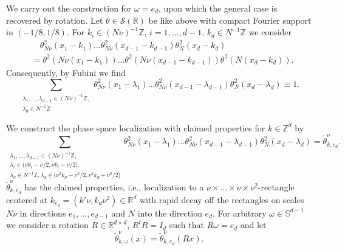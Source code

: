 \documentclass{amsart}
\numberwithin{equation}{section}
\theoremstyle{definition}
\newcommand{\R}{\mathbb{R}}
\newcommand{\Z}{\mathbb{Z}}
\begin{document}
We carry out the construction for $\omega = e_d$, upon which the general case is recovered by rotation. Let $\theta \in \mathcal{S}(\R)$ be like above with compact Fourier support in $(-1/8,1/8)$. For $k_i \in (N \nu)^{-1} \Z$, $i=1,\ldots,d-1$, $k_d \in N^{-1} \Z$ we consider
\begin{equation*}
\begin{split}
&\quad \theta^2_{N \nu}(x_1-k_1) \ldots \theta^2_{N \nu}(x_{d-1} - k_{d-1}) \theta^2_N(x_d-k_d) \\
&= \theta^2(N \nu(x_1-k_1)) \ldots \theta^2(N \nu(x_{d-1} - k_{d-1})) \theta^2(N(x_d - k_d)).
\end{split}
\end{equation*}
Consequently, by Fubini we find
\begin{equation*}
\sum_{\substack{ \lambda_1,\ldots, \lambda_{d-1} \in (N \nu)^{-1} \Z, \\ \lambda_d \in N^{-1} \Z}} \theta^2_{N \nu}(x_1-\lambda_1) \ldots \theta^2_{N \nu}(x_{d-1} - \lambda_{d-1}) \theta^2_N(x_d - \lambda_d) \equiv 1.
\end{equation*}

We construct the phase space localization with claimed properties for $k \in \Z^d$ by
\begin{equation*}
\sum_{\substack{ \lambda_1,\ldots,\lambda_{d-1} \in (N \nu)^{-1} \Z, \\ \lambda_i \in (\nu k_i - \nu/2, \nu k_i + \nu/2], \\ \lambda_d \in N^{-1} \Z, \lambda_d \in (\nu^2 k_d - \nu^2/2,\nu^2 k_d + \nu^2/2]}} \theta^2_{N \nu}(x_1 - \lambda_1) \ldots \theta^2_{N \nu}(x_{d-1} - \lambda_{d-1}) \theta_N^2(x_d- \lambda_d) = \tilde{\theta}_{k,e_d}^{\nu}.
\end{equation*}
$\tilde{\theta}_{k,e_d}^{\nu}$ has the claimed properties, i.e., localization to a $\nu \times \ldots \times \nu \times \nu^2$-rectangle centered at $k_{e_d} = (k'\nu, k_d \nu^2) \in \R^d$ with rapid decay off the rectangles on scales $N \nu$ in directions $e_1,\ldots,e_{d-1}$ and $N$ into the direction $e_d$. For arbitrary $\omega \in \mathbb{S}^{d-1}$ we consider a rotation $R \in \R^{d\times d}$, $R^t R = I_d$ such that $R \omega= e_d$ and let 
\begin{equation*}
\tilde{\theta}^{\nu}_{k,\omega}(x) =  \tilde{\theta}^{\nu}_{k,e_d}(R x).
\end{equation*}
\end{document}
